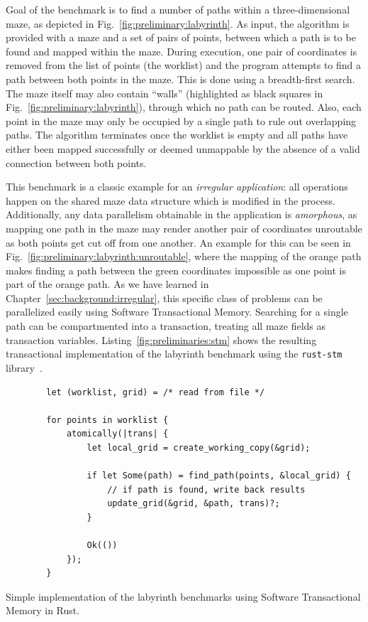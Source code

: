 Goal of the benchmark is to find a number of paths within a three-dimensional maze, as depicted in Fig.~\ref{fig:preliminary:labyrinth}.
As input, the algorithm is provided with a maze and a set of pairs of points, between which a path is to be found and mapped within the maze.
During execution, one pair of coordinates is removed from the list of points (the worklist) and the program attempts to find a path between both points in the maze.
This is done using a breadth-first search.
The maze itself may also contain \enquote{walls} (highlighted as black squares in Fig.~\ref{fig:preliminary:labyrinth}), through which no path can be routed.
Also, each point in the maze may only be occupied by a single path to rule out overlapping paths.
The algorithm terminates once the worklist is empty and all paths have either been mapped successfully or deemed unmappable by the absence of a valid connection between both points.

This benchmark is a classic example for an \emph{irregular application}: all operations happen on the shared maze data structure which is modified in the process.
Additionally, any data parallelism obtainable in the application is \emph{amorphous}, as mapping one path in the maze may render another pair of coordinates unroutable as both points get cut off from one another.
An example for this can be seen in Fig.~\ref{fig:preliminary:labyrinth:unroutable}, where the mapping of the orange path makes finding a path between the green coordinates impossible as one point is part of the orange path.
As we have learned in Chapter~\ref{sec:background:irregular}, this specific class of problems can be parallelized easily using Software Transactional Memory.
Searching for a single path can be compartmented into a transaction, treating all maze fields as transaction variables.
Listing~\ref{fig:preliminaries:stm} shows the resulting transactional implementation of the labyrinth benchmark using the \texttt{rust-stm} library~\cite{bergmann2020stm}.

\begin{listing}[t]
    \begin{verbatim}
        let (worklist, grid) = /* read from file */

        for points in worklist {
            atomically(|trans| {
                let local_grid = create_working_copy(&grid);

                if let Some(path) = find_path(points, &local_grid) {
                    // if path is found, write back results
                    update_grid(&grid, &path, trans)?;
                }

                Ok(())
            });
        }
    \end{verbatim}
    \caption{Simple implementation of the labyrinth benchmarks using Software Transactional Memory in Rust.}%
    \label{fig:preliminaries:stm}
\end{listing}

